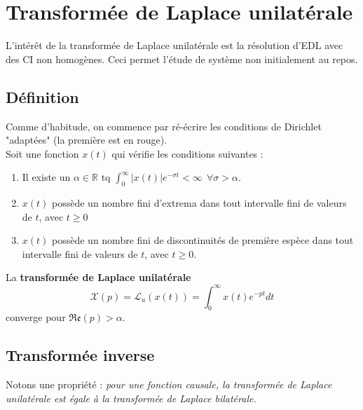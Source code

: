 	
	
\section{Transformée de Laplace unilatérale}
L'intérêt de la transformée de Laplace unilatérale est la résolution d'EDL avec des CI non homogènes.
Ceci permet l'étude de système non initialement au repos.
	
	\subsection{Définition}
	Comme d'habitude, on commence par ré-écrire les conditions de Dirichlet "adaptées" (la première
	est en rouge).\\
	Soit une fonction $x(t)$ qui vérifie les conditions suivantes :
	\begin{enumerate}
	\item Il existe un $\alpha \in \mathbb{R}$ tq $\int_0^\infty |x(t)|e^{-\sigma t} < \infty\ \ 
	\forall \sigma > \alpha$.
	\item $x(t)$ possède un nombre fini d'extrema dans tout intervalle fini de valeurs de $t$, avec
	$t\geq 0$
	\item $x(t)$ possède un nombre fini de discontinuités de première espèce dans tout intervalle
	fini de valeurs de $t$, avec $t\geq 0$.
	\end{enumerate}
	La \textbf{transformée de Laplace unilatérale}
	\begin{equation}
	\mathcal{X}(p) = \mathcal{L}_u(x(t)) = \int_0^\infty x(t)e^{-pt}dt
	\end{equation}
	converge pour $\mathfrak{Re}(p)>\alpha$.
	
	\subsection{Transformée inverse}
	
	Notons une propriété : \textit{pour une fonction causale, la transformée de Laplace unilatérale  
	est	égale à la transformée de Laplace bilatérale.}
	

